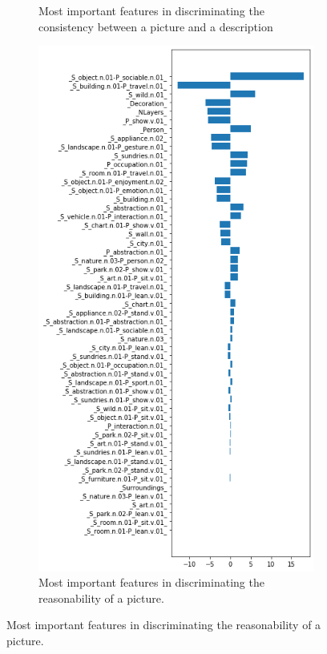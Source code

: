 \documentclass{article} %
\begin{document}
\begin{figure}[htbp]
\begin{subfigure}{0.5\linewidth}
		\caption{Most important features in discriminating the consistency between a picture and a description}
		\label{fig: consistent-feat}
	\end{subfigure}
	\begin{subfigure}{0.48\linewidth}
		\centering
		\includegraphics[width=\linewidth]{../results/realityFEAT_temp}
		\caption{Most important features in discriminating the reasonability of a picture.}
		\label{fig: real-feat}
	\end{subfigure}
\end{figure}
\end{document}
